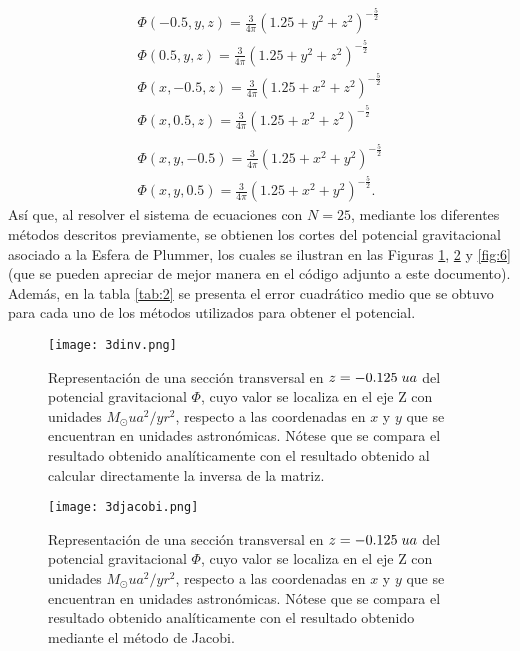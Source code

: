 \documentclass[reprint,amsmath,amssymb,aps]{revtex4-1}
\begin{document}
\begin{eqnarray}
    \varPhi(-0.5,y,z)= \frac{3}{4\pi} \left( 1.25+y^2+z^2 \right)^{-\frac{5}{2}}\\
    \varPhi(0.5,y,z)= \frac{3}{4\pi} \left( 1.25+y^2+z^2 \right)^{-\frac{5}{2}}\\
    \varPhi(x,-0.5,z)=\frac{3}{4\pi} \left( 1.25+x^2+z^2 \right)^{-\frac{5}{2}}\\
    \varPhi(x,0.5,z)=\frac{3}{4\pi} \left( 1.25+x^2+z^2 \right)^{-\frac{5}{2}}\\\\
    \varPhi(x,y,-0.5)=\frac{3}{4\pi} \left( 1.25+x^2+y^2 \right)^{-\frac{5}{2}}\\
    \varPhi(x,y,0.5)=\frac{3}{4\pi} \left( 1.25+x^2+y^2 \right)^{-\frac{5}{2}}.
\end{eqnarray}
Así que, al resolver el sistema de ecuaciones con $N=25$, mediante los diferentes métodos descritos previamente, se obtienen los cortes del potencial gravitacional asociado a la Esfera de Plummer, los cuales se ilustran en las Figuras \ref{fig:4}, \ref{fig:5} y \ref{fig:6} (que se pueden apreciar de mejor manera en el código adjunto a este documento). Además, en la tabla \ref{tab:2} se presenta el error cuadrático medio que se obtuvo para cada uno de los métodos utilizados para obtener el potencial. \\
\begin{figure}
    \centering
    \texttt{[image: 3dinv.png]}
    \caption{Representación de una sección transversal en $z=-0.125 \hspace{0.1 cm} ua$ del potencial gravitacional $\varPhi$, cuyo valor se localiza en el eje Z con unidades $M_{\odot} ua^2/yr^2$, respecto a las coordenadas en $x$ y $y$ que se encuentran en unidades astronómicas. Nótese que se compara el resultado obtenido analíticamente con el resultado obtenido al calcular directamente la inversa de la matriz.}
    \label{fig:4}
\end{figure}
\begin{figure}
    \centering
    \texttt{[image: 3djacobi.png]}
    \caption{Representación de una sección transversal en $z=-0.125 \hspace{0.1 cm} ua$ del potencial gravitacional $\varPhi$, cuyo valor se localiza en el eje Z con unidades $M_{\odot} ua^2/yr^2$, respecto a las coordenadas en $x$ y $y$ que se encuentran en unidades astronómicas. Nótese que se compara el resultado obtenido analíticamente con el resultado obtenido mediante el método de Jacobi.}
    \label{fig:5}
\end{figure}
\end{document}
